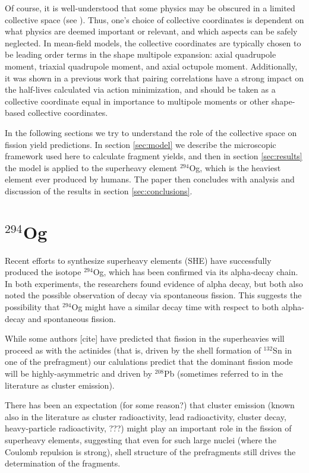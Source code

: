 Of course, it is well-understood that some physics may be obscured in a limited collective space (see \cite{Dubray2012}). Thus, one's choice of collective coordinates is dependent on what physics are deemed important or relevant, and which aspects can be safely neglected. In mean-field models, the collective coordinates are typically chosen to be leading order terms in the shape multipole expansion: axial quadrupole moment, triaxial quadrupole moment, and axial octupole moment. Additionally, it was shown in a previous work \cite{Sadhukhan2014} that pairing correlations have a strong impact on the half-lives calculated via action minimization, and should be taken as a collective coordinate equal in importance to multipole moments or other shape-based collective coordinates.

In the following sections we try to understand the role of the collective space on fission yield predictions. In section \ref{sec:model} we describe the microscopic framework used here to calculate fragment yields, and then in section \ref{sec:results} the model is applied to the superheavy element $^{294}$Og, which is the heaviest element ever produced by humans. The paper then concludes with analysis and discussion of the results in section \ref{sec:conclusions}.

\section{$^{294}$Og}

Recent efforts to synthesize superheavy elements (SHE) have successfully produced the isotope $^{294}$Og, which has been confirmed via its alpha-decay chain. In both experiments, the researchers found evidence of alpha decay, but both also noted the possible observation of decay via spontaneous fission. This suggests the possibility that $^{294}$Og might have a similar decay time with respect to both alpha-decay and spontaneous fission.

While some authors [cite] have predicted that fission in the superheavies will proceed as with the actinides (that is, driven by the shell formation of $^{132}$Sn in one of the prefragment) our calulations predict that the dominant fission mode will be highly-asymmetric and driven by $^{208}$Pb (sometimes referred to in the literature as cluster emission).

There has been an expectation (for some reason?) that cluster emission (known also in the literature as cluster radioactivity, lead radioactivity, cluster decay, heavy-particle radioactivity, ???) might play an important role in the fission of superheavy elements, suggesting that even for such large nuclei (where the Coulomb repulsion is strong), shell structure of the prefragments still drives the determination of the fragments.

